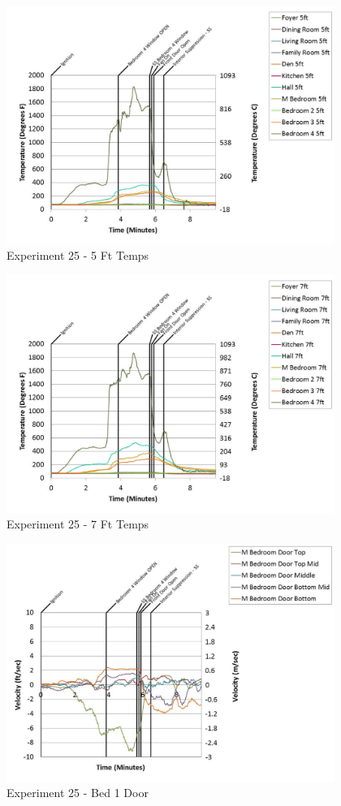 \documentclass{article}
\begin{document}
\begin{appendices}
	\begin{figure}[h!]
		\centering
		\includegraphics[height=3.05in]{0_Images/Results_Charts/Exp_25_Charts/5FtTemps.pdf}
		\caption{Experiment 25 - 5 Ft Temps}
	\end{figure}
 

	\begin{figure}[h!]
		\centering
		\includegraphics[height=3.05in]{0_Images/Results_Charts/Exp_25_Charts/7FtTemps.pdf}
		\caption{Experiment 25 - 7 Ft Temps}
	\end{figure}
 
	\clearpage

	\begin{figure}[h!]
		\centering
		\includegraphics[height=3.05in]{0_Images/Results_Charts/Exp_25_Charts/Bed1Door.pdf}
		\caption{Experiment 25 - Bed 1 Door}
	\end{figure}
 


\end{appendices}
\end{document}
